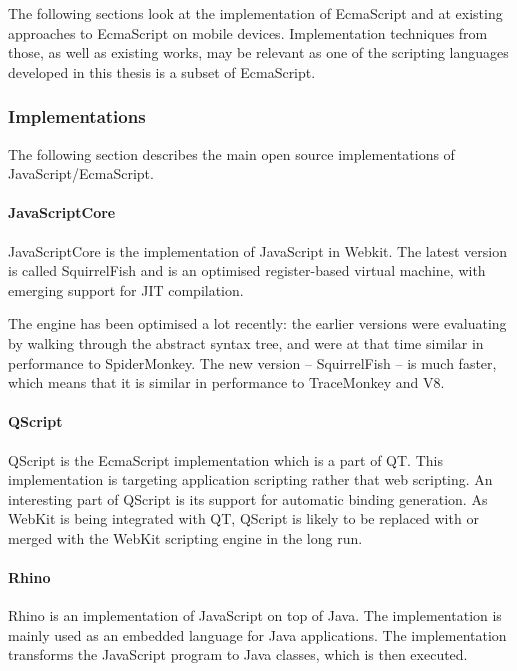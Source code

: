 \documentclass[11pt]{report}
\begin{document}
The following sections look at the implementation of EcmaScript and at existing approaches to EcmaScript on mobile devices. Implementation techniques from those, as well as existing works, may be relevant as one of the scripting languages developed in this thesis is a subset of EcmaScript.

\subsubsection{Implementations}
The following section describes the main open source implementations of JavaScript/EcmaScript.

\paragraph{JavaScriptCore} 
JavaScriptCore is the implementation of JavaScript in Webkit.
The latest version is called SquirrelFish and is an optimised register-based virtual machine,
with emerging support for JIT compilation.

The engine has been optimised a lot recently: the earlier versions were evaluating by walking through the abstract syntax tree, and were at that time similar in performance to SpiderMonkey.
The new version -- SquirrelFish -- is much faster, which means that it is similar in performance to TraceMonkey and V8.

\paragraph{QScript}
QScript is the EcmaScript implementation which is a part of QT. This implementation is targeting application scripting rather that web scripting. An interesting part of QScript is its support for automatic binding generation. As WebKit is being integrated with QT, QScript is likely to be replaced with or merged with the WebKit scripting engine in the long run.

\paragraph{Rhino}
Rhino is an implementation of JavaScript on top of Java. The implementation is mainly used as an embedded language for Java applications. The implementation transforms the JavaScript program to Java classes, which is then executed.
\end{document}
